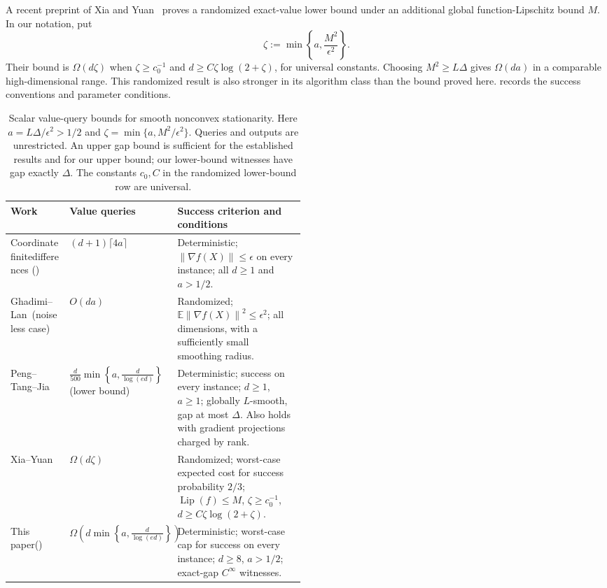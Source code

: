 \documentclass[11pt]{article}
\numberwithin{equation}{section}
\theoremstyle{definition}
\theoremstyle{remark}
\newcommand{\norm}[1]{\left\lVert #1\right\rVert}
\newcommand{\Lip}{\operatorname{Lip}}
\newcommand{\E}{\mathbb{E}}
\begin{document}
A recent preprint of Xia and Yuan~\cite[Theorem~2.3]{XY2026} proves a
randomized exact-value lower bound under an additional global
function-Lipschitz bound $M$. In our notation, put
\[
 \zeta:=\min\!\left\{a,\frac{M^2}{\epsilon^2}\right\}.
\]
Their bound is $\Omega(d\zeta)$ when
$\zeta\geq c_0^{-1}$ and $d\geq C\zeta\log(2+\zeta)$, for universal
constants. Choosing $M^2\geq L\Delta$ gives $\Omega(da)$ in a comparable
high-dimensional range. This randomized result is also stronger in its
algorithm class than the bound proved here. 
records the success conventions and parameter conditions.

\begin{table}[!t]
\centering
\small
\renewcommand{\arraystretch}{1.2}
\setlength{\tabcolsep}{4pt}
\caption{Scalar value-query bounds for smooth nonconvex stationarity.
Here $a=L\Delta/\epsilon^2>1/2$ and
$\zeta=\min\{a,M^2/\epsilon^2\}$. Queries and outputs are unrestricted.
An upper gap bound is sufficient for the established results and for our
upper bound; our lower-bound witnesses have gap exactly $\Delta$.
The constants $c_0,C$ in the randomized lower-bound row are universal.}
\label{tab:comparison}
\begin{tabularx}{\linewidth}{@{}>{\raggedright\arraybackslash}p{0.20\linewidth}>{\raggedright\arraybackslash}p{0.29\linewidth}Y@{}}
\toprule
Work & Value queries & Success criterion and conditions\\
\midrule
Coordinate finite\newline differences\newline
()
& $(d+1)\lceil4a\rceil$
& Deterministic; $\norm{\nabla f(X)}\leq\epsilon$ on every instance;
all $d\geq1$ and $a>1/2$.\\
\addlinespace[5pt]
Ghadimi--Lan~\cite{GL2013}\newline(noiseless case)
& $O(da)$
& Randomized; $\E\norm{\nabla f(X)}^2\leq\epsilon^2$;
all dimensions, with a sufficiently small smoothing radius.\\
\addlinespace[5pt]
Peng--Tang--Jia\newline\cite[Theorem~E.8]{PTJ2026}
& $\displaystyle\frac{d}{500}\min\!\left\{a,\frac{d}{\log(ed)}\right\}$
\newline(lower bound)
& Deterministic; success on every instance; $d\geq1$, $a\geq1$;
globally $L$-smooth, gap at most $\Delta$. Also holds with
gradient projections charged by rank.\\
\addlinespace[5pt]
Xia--Yuan\newline\cite[Theorem~2.3]{XY2026}
& $\Omega(d\zeta)$
& Randomized; worst-case expected cost for success probability $2/3$;
$\Lip(f)\leq M$, $\zeta\geq c_0^{-1}$,
$d\geq C\zeta\log(2+\zeta)$.\\
\addlinespace[5pt]
This paper\newline()
& $\displaystyle\Omega\!\left(d\min\!\left\{a,\frac{d}{\log(ed)}\right\}\right)$
& Deterministic; worst-case cap for success on every instance;
$d\geq8$, $a>1/2$; exact-gap $C^\infty$ witnesses.\\
\bottomrule
\end{tabularx}
\end{table}
\end{document}
